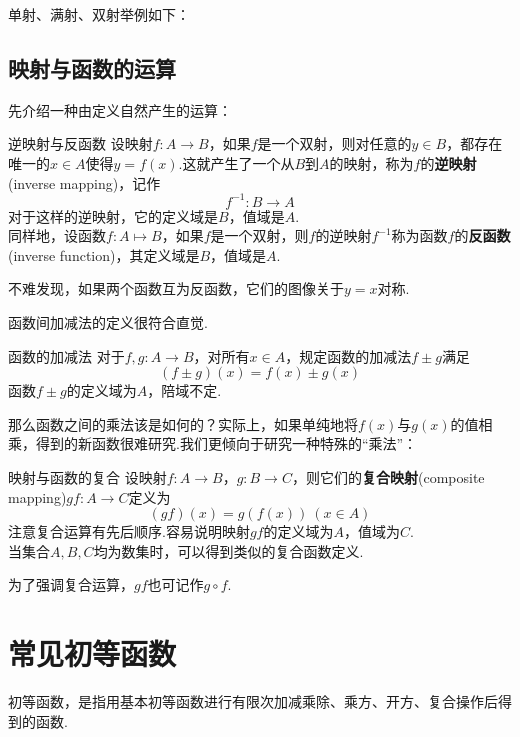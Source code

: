\documentclass[lang=cn, zihao=5]{elegantbook}
\begin{document}
单射、满射、双射举例如下：


\subsection{映射与函数的运算}

先介绍一种由定义自然产生的运算：

\begin{definition}{逆映射与反函数} %
    设映射$f:A \to B$，如果$f$是一个双射，则对任意的$y \in B$，都存在唯一的$x \in A$使得$y=f(x)$.这就产生了一个从$B$到$A$的映射，称为$f$的\textbf{逆映射}(inverse mapping)，记作$$f^{-1}:B \to A$$
    对于这样的逆映射，它的定义域是$B$，值域是$A$.\\
    同样地，设函数$f:A \mapsto B$，如果$f$是一个双射，则$f$的逆映射$f^{-1}$称为函数$f$的\textbf{反函数}(inverse function)，其定义域是$B$，值域是$A$.
\end{definition}

不难发现，如果两个函数互为反函数，它们的图像关于$y=x$对称.

函数间加减法的定义很符合直觉.

\begin{definition}{函数的加减法}
	对于$f,g:A \to B$，对所有$x \in A$，规定函数的加减法$f \pm g$满足$$(f \pm g)(x) = f(x) \pm g(x)$$
	函数$f \pm g$的定义域为$A$，陪域不定.
\end{definition}

那么函数之间的乘法该是如何的？实际上，如果单纯地将$f(x)$与$g(x)$的值相乘，得到的新函数很难研究.我们更倾向于研究一种特殊的“乘法”：

\begin{definition}{映射与函数的复合} %
    设映射$f:A \to B$，$g:B \to C$，则它们的\textbf{复合映射}(composite mapping)$gf:A \to C$定义为$$(gf)(x)=g(f(x)) \ (x \in A)$$
    注意复合运算有先后顺序.容易说明映射$gf$的定义域为$A$，值域为$C$.\\
    当集合$A,B,C$均为数集时，可以得到类似的复合函数定义.
\end{definition}
\begin{remark}
	为了强调复合运算，$gf$也可记作$g \circ f$.
\end{remark}

\section{常见初等函数}

初等函数，是指用基本初等函数进行有限次加减乘除、乘方、开方、复合操作后得到的函数.
\end{document}
